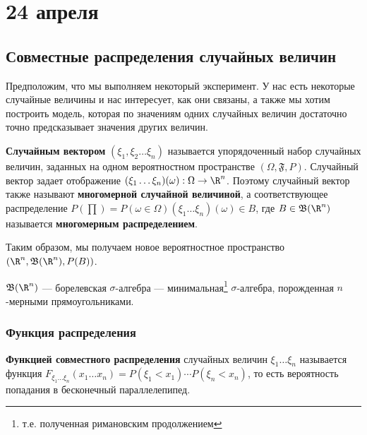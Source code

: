 \chapter{24 апреля}

\section{Совместные распределения случайных величин}

Предположим, что мы выполняем некоторый эксперимент. У нас есть некоторые случайные величины и нас интересует, как они связаны, а также мы хотим построить модель, которая по значениям одних случайных величин достаточно точно предсказывает значения других величин.

\begin{definition}
    \textbf{Случайным вектором} \((\xi_1, \xi_2 \dots \xi_n)\) называется упорядоченный набор случайных величин, заданных на одном вероятностном пространстве \((\Omega, \mathfrak{F}, P)\). Случайный вектор задает отображение \((\xi_1 \dots \xi_n)(\omega) : \Omega \to \R^n\). Поэтому случайный вектор также называют \textbf{многомерной случайной величиной}, а соответствующее распределение \(P(\prod) = P(\omega \in \Omega)(\xi_1 \dots \xi_n)(\omega) \in B\), где \(B \in \mathfrak{B}(\R^n)\) называется \textbf{многомерным распределением}.
\end{definition}

Таким образом, мы получаем новое вероятностное пространство \((\R^n, \mathfrak{B}(\R^n), P(B))\).

\begin{remark}
    \(\mathfrak{B}(\R^n)\) --- борелевская \(\sigma\)-алгебра --- минимальная\footnote{т.е. полученная римановским продолжением} \(\sigma\)-алгебра, порожденная \(n\)-мерными прямоугольниками.
\end{remark}

\subsection{Функция распределения}

\begin{definition}
    \textbf{Функцией совместного распределения} случайных величин \(\xi_1 \dots \xi_n\) называется функция \(F_{\xi_1 \dots \xi_n}(x_1 \dots x_n) = P(\xi_1 < x_1) \cdots P(\xi_n < x_n)\), то есть вероятность попадания в бесконечный параллелепипед.
\end{definition}

